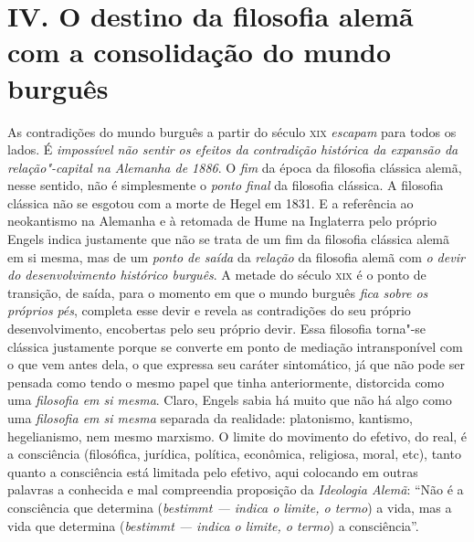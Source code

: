 \section*{IV. O destino da filosofia alemã com a consolidação do mundo burguês}

As contradições do mundo burguês a partir do século \textsc{xix} \emph{escapam}
para todos os lados. É \emph{impossível não sentir os efeitos da
contradição histórica da expansão da relação"-capital na Alemanha de
1886}. O \emph{fim} da época da filosofia clássica alemã, nesse sentido,
não é simplesmente o \emph{ponto final} da filosofia clássica. A
filosofia clássica não se esgotou com a morte de Hegel em 1831. E a
referência ao neokantismo na Alemanha e à retomada de Hume na Inglaterra
pelo próprio Engels indica justamente que não se trata de um fim da
filosofia clássica alemã em si mesma, mas de um \emph{ponto de saída} da
\emph{relação} da filosofia alemã com \emph{o devir do desenvolvimento
histórico burguês}. A metade do século \textsc{xix} é o ponto de transição, de
saída, para o momento em que o mundo burguês \emph{fica sobre os
próprios} \emph{pés}, completa esse devir e revela as contradições do
seu próprio desenvolvimento, encobertas pelo seu próprio devir. Essa
filosofia torna"-se clássica justamente porque se converte em ponto de
mediação intransponível com o que vem antes dela, o que expressa seu
caráter sintomático, já que não pode ser pensada como tendo o mesmo
papel que tinha anteriormente, distorcida como uma \emph{filosofia em si
mesma}. Claro, Engels sabia há muito que não há algo como uma
\emph{filosofia em si mesma} separada da realidade: platonismo,
kantismo, hegelianismo, nem mesmo marxismo. O limite do movimento do
efetivo, do real, é a consciência (filosófica, jurídica, política,
econômica, religiosa, moral, etc), tanto quanto a consciência está
limitada pelo efetivo, aqui colocando em outras palavras a conhecida e
mal compreendia proposição da \emph{Ideologia Alemã}: ``Não é a
consciência que determina (\emph{bestimmt --- indica o limite, o termo})
a vida, mas a vida que determina (\emph{bestimmt --- indica o limite, o
termo}) a consciência''.

